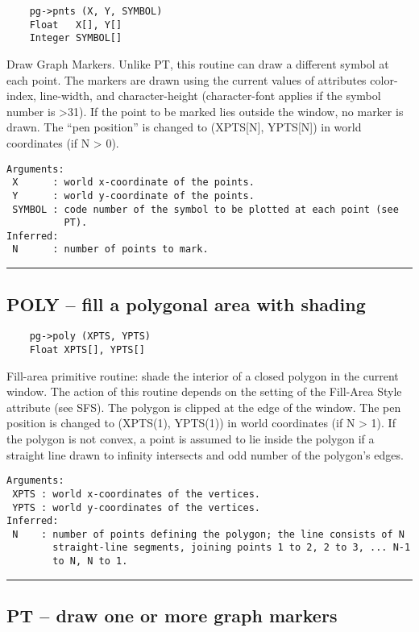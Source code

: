 \begin{verbatim}
    pg->pnts (X, Y, SYMBOL)
    Float   X[], Y[]
    Integer SYMBOL[]
\end{verbatim}

Draw Graph Markers.  Unlike PT, this routine can draw a different
symbol at each point.  The markers are drawn using the current values
of attributes color-index, line-width, and character-height
(character-font applies if the symbol number is >31).  If the point to
be marked lies outside the window, no marker is drawn.  The ``pen
position'' is changed to (XPTS[N], YPTS[N]) in world coordinates (if N
> 0).

\begin{verbatim}
Arguments:
 X      : world x-coordinate of the points.
 Y      : world y-coordinate of the points.
 SYMBOL : code number of the symbol to be plotted at each point (see
          PT). 
Inferred:
 N      : number of points to mark.
\end{verbatim}

\hrule

\subsection*{POLY -- fill a polygonal area with shading }

\begin{verbatim}
    pg->poly (XPTS, YPTS)
    Float XPTS[], YPTS[]
\end{verbatim}

Fill-area primitive routine: shade the interior of a closed polygon in
the current window.  The action of this routine depends on the setting
of the Fill-Area Style attribute (see SFS).  The polygon is clipped at
the edge of the window.  The pen position is changed to (XPTS(1),
YPTS(1)) in world coordinates (if N > 1).  If the polygon is not
convex, a point is assumed to lie inside the polygon if a straight
line drawn to infinity intersects and odd number of the polygon's
edges.

\begin{verbatim}
Arguments:
 XPTS : world x-coordinates of the vertices.
 YPTS : world y-coordinates of the vertices.
Inferred:
 N    : number of points defining the polygon; the line consists of N
        straight-line segments, joining points 1 to 2, 2 to 3, ... N-1
        to N, N to 1. 
\end{verbatim}

\hrule

\subsection*{PT -- draw one or more graph markers }

